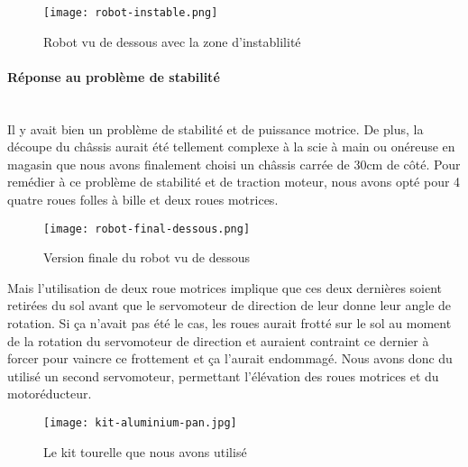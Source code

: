 \documentclass[12pt,a4paper]{article}
\begin{document}
	\begin{figure}[ht!]
		\centering
			\texttt{[image: robot-instable.png]}
			\caption[Robot vu de dessous avec la zone d'instablilité - Illustration réalisée par notre groupe, disponible à l'adresse : \url{https://github.com/thaspdev/PATRICK/illustrations/robot-instable.png}]{Robot vu de dessous avec la zone d'instablilité\label{overflow}}
	\end{figure}
	
	\paragraph{Réponse au problème de stabilité}\mbox{}\\
	
	Il y avait bien un problème de stabilité et de puissance motrice. De plus, la découpe du châssis aurait été tellement complexe à la scie à main ou onéreuse en magasin que nous avons finalement choisi un châssis carrée de 30cm de côté.
Pour remédier à ce problème de stabilité et de traction moteur, nous avons opté pour 4 quatre roues folles à bille et deux roues motrices.

	\begin{figure}[ht!]
		\centering
			\texttt{[image: robot-final-dessous.png]}
			\caption[Version finale du robot vu de dessous - Illustration réalisée par notre groupe, disponible à l'adresse : \url{https://github.com/thaspdev/PATRICK/illustrations/robot-final-dessous.png}]{Version finale du robot vu de dessous\label{overflow}}
	\end{figure}
	
	Mais l’utilisation de deux roue motrices implique que ces deux dernières soient retirées du sol avant que le servomoteur de direction de leur donne leur angle de rotation. Si ça n’avait pas été le cas, les roues aurait frotté sur le sol au moment de la rotation du servomoteur de direction et auraient contraint ce dernier à forcer pour vaincre ce frottement et ça l’aurait endommagé. Nous avons donc du utilisé un second servomoteur, permettant l’élévation des roues motrices et du motoréducteur.
	
	\begin{figure}[ht!]
		\centering
			\texttt{[image: kit-aluminium-pan.jpg]}
			\caption[Le kit tourelle que nous avons utilisé - Illustration provenant du site internet robotshop.com, disponible à l'adresse : \url{http://www.robotshop.com/eu/fr/kit-aluminium-pan-and-tilt-lynxmotion.html}]{Le kit tourelle que nous avons utilisé\label{overflow}}
	\end{figure}
	\newpage
	
\end{document}

